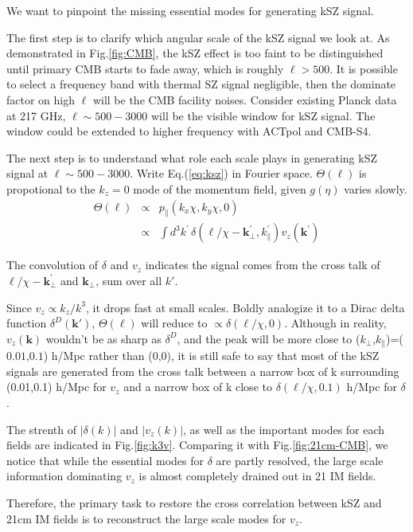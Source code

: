 We want to pinpoint the missing essential modes for generating kSZ signal. 

The first step is to clarify which angular scale of the kSZ signal 
we look at. 
As demonstrated in Fig.\ref{fig:CMB}, 
the kSZ effect is too faint to 
be distinguished until 
primary CMB starts to fade away, 
which is roughly $\ell>500$. 
It is possible to select a frequency band with thermal SZ signal negligible, 
then the dominate factor on high $\ell$ will be the CMB facility noises. 
Consider existing Planck \cite{Planck2015} data at 217 GHz, 
$\ell \sim 500-3000$ will be the visible window for kSZ signal. 
The window could be extended to higher frequency with 
ACTpol and CMB-S4. 


The next step is to understand what role each scale plays in generating kSZ signal 
at $\ell \sim 500-3000$. 
Write Eq.(\ref{eq:ksz}) in Fourier space. 
$\Theta(\bm{\ell})$ is propotional to the $k_z=0$ mode of the momentum field, 
given $g(\eta)$ varies slowly. 
\begin{eqnarray}
    \label{eq:thetak}
    \Theta(\bm{\ell})&\propto&p_\parallel({k}_x\chi,{k}_y\chi,0)\\
    &\propto&\int 
    d^3k^\prime\,\delta(\bm{\ell}/\chi-\bm{k}_\perp^\prime,k_\parallel^\prime) v_z(\bm{k^\prime})\nonumber
    \end{eqnarray}

The convolution of $\delta$ and $v_z$ 
indicates the signal comes from the cross talk of 
$\bm{\ell}/\chi-\bm{k}_\perp^\prime$ and $\bm{k}_\perp$, 
sum over all $k\prime$. 

Since $v_z \propto k_z/k^3$, 
it drops fast at small scales. 
Boldly analogize it to a Dirac delta function $\delta^D(\bm{k}\prime)$, 
$\Theta(\bm{\ell})$ will reduce to $\propto\delta(\bm{\ell}/\chi,0)$. 
Although in reality, $v_z(\bm{k})$ 
wouldn't be as sharp as $\delta^D$, 
and the peak will be more close to 
($k_\perp$,$k_\parallel$)=($0.01$,$0.1$) h/Mpc 
rather than (0,0),
it is still safe to say 
that most of the kSZ signals are 
generated from the cross talk between a narrow box of k 
surrounding (0.01,0.1) h/Mpc for $v_z$ 
and a narrow box of k close to 
$\delta(\bm{\ell}/\chi,0.1)$ h/Mpc 
for $\delta$.

The strenth of $|\delta(k)|$ and $|v_z(k)|$, 
as well as the important modes for each fields 
are indicated in Fig.\ref{fig:k3v}. 
Comparing it with Fig.\ref{fig:21cm-CMB}, 
we notice that while the 
essential modes for $\delta$ are partly resolved, 
the large scale information dominating $v_z$ is 
almost completely drained out in 21 IM fields.

Therefore, the primary task to restore the cross correlation 
between kSZ and 21cm IM fields is to reconstruct the 
large scale modes for $v_z$.
